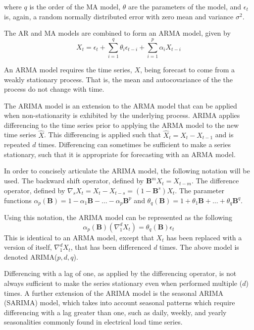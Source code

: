 where $q$ is the order of the MA model, $\theta$ are the parameters of the model, and $\epsilon_{t}$ is, again, a random normally distributed error with zero mean and variance $\sigma^2$.
\par
The AR and MA models are combined to form an ARMA model, given by 
\begin{equation}
X_{t} = \epsilon_{t} + \sum_{i=1}^{q}\theta_{i}\epsilon_{t-i} + \sum_{i=1}^{p}\alpha_{i}X_{t-i}
\end{equation}
\par
An ARMA model requires the time series, $X$, being forecast to come from a weakly stationary process.
That is, the mean and autocovariance of the the process do not change with time.
\par
The ARIMA model is an extension to the ARMA model that can be applied when non-stationarity is exhibited by the underlying process.
ARIMA applies differencing to the time series prior to applying the ARMA model to the new time series $\hat{X}$.
This differencing is applied such that $\hat{X}_{t} = X_{t} - X_{t-1}$ and is repeated $d$ times.
Differencing can sometimes be sufficient to make a series stationary, such that it is appropriate for forecasting with an ARMA model.
\par
In order to concisely articulate the ARIMA model, the following notation will be used. The backward shift operator, defined by $\textbf{B}^{m}X_{t} = X_{t-m}$. The difference operator, defined by $\nabla_{s} X_{t} = X_{t} - X_{t-s} = (1 - \textbf{B}^{s})X_{t}$. The parameter functions $\alpha_{p}(\textbf{B}) = 1 - \alpha_{1}\textbf{B} - \ldots - \alpha_{p}\textbf{B}^p$ and $\theta_{q}(\textbf{B}) = 1 + \theta_{1}\textbf{B} + \ldots + \theta_{q}\textbf{B}^q$.
\par
Using this notation, the ARIMA model can be represented as the following
\begin{equation}
\alpha_{p}(\textbf{B})(\nabla_{1}^{d}X_{t}) = \theta_{q}(\textbf{B})\epsilon_{t}
\end{equation}
This is identical to an ARMA model, except that $X_{t}$ has been replaced with a  version of itself, $\nabla_{1}^{d}X_{t}$, that has been differenced $d$ times.
The above model is denoted ARIMA($p,d,q$).
\par
Differencing with a lag of one, as applied by the differencing operator, is not always sufficient to make the series stationary even when performed multiple ($d$) times.
A further extension of the ARIMA model is the seasonal ARIMA (SARIMA) model, which takes into account seasonal patterns which require differencing with a lag greater than one, such as daily, weekly, and yearly seasonalities commonly found in electrical load time series.
